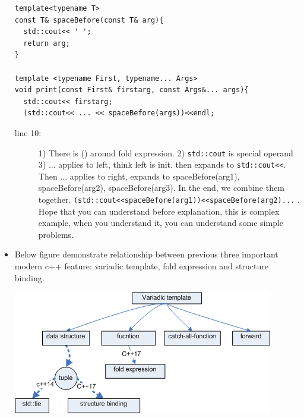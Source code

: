 \documentclass[a4paper,11pt,twoside]{book}
\begin{document}
\begin{itemize}
\begin{lstlisting}
template<typename T>
const T& spaceBefore(const T& arg){
  std::cout<< ' ';
  return arg;
}

template <typename First, typename... Args>
void print(const First& firstarg, const Args&... args){
  std::cout<< firstarg;
  (std::cout<< ... << spaceBefore(args))<<endl;
\end{lstlisting}

\begin{description}
    \item[line 10:] 1) There is () around fold expression. 2) \texttt{std::cout} is special operand 3) ... applies to left, think left is init. then expands to \texttt{std::cout<<}. Then ... applies to right, expands to spaceBefore(arg1), spaceBefore(arg2), spaceBefore(arg3). In the end, we combine them together. \texttt{(std::cout<<spaceBefore(arg1))<<spaceBefore(arg2)...} . Hope that you can understand before explanation, this is complex example, when you understand it, you can understand some simple problems. 
\end{description}

	\item Below figure demonstrate relationship between previous three important modern c++ feature: variadic template, fold expression and structure binding. 
\begin{center}
	\includegraphics[width=0.80\linewidth]{pics/Variadic.png}
\end{center}
\end{itemize}
\end{document}
